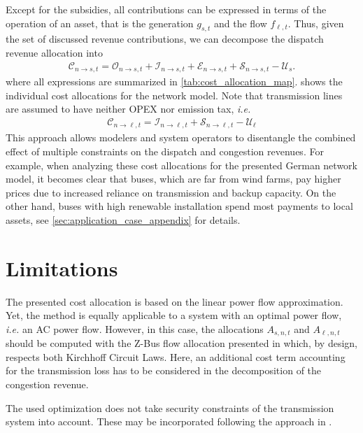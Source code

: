 \documentclass[11pt,twocolumn]{article}
\newcommand{\ie}{\textit{i.e.} }
\newcommand{\ra}{\rightarrow}
\newcommand{\generation}{g_{s,t}}
\newcommand{\flow}{f_{\ell,t}}
\newcommand{\cost}{\mathcal{C}}
\newcommand{\opex}{\mathcal{O}}
\newcommand{\capex}{\mathcal{I}}
\newcommand{\emissioncost}{\mathcal{E}}
\newcommand{\scarcitycost}{\mathcal{S}}
\newcommand{\subsidycost}{\mathcal{U}}
\newcommand{\allocategeneration}[1][s, n]{A_{#1,t}}
\newcommand{\allocateflow}[1][n]{A_{\ell,#1,t}}
\newcommand{\allocategeneratorcost}[1][n \rightarrow s]{\cost_{#1, t}}
\newcommand{\allocatelinecost}[1][n \rightarrow \ell]{\cost_{#1, t}}
\newcommand{\allocatecapex}[1][n \rightarrow s,t]{\mathcal{I}_{#1}}
\newcommand{\allocateopex}[1][n \rightarrow s]{\opex_{#1,t}}
\newcommand{\allocateemissioncost}[1][n \rightarrow s]{\emissioncost_{#1,t}}
\newcommand{\allocatescarcitycost}[1][n \rightarrow s]{\scarcitycost_{#1,t}}
\begin{document}
Except for the subsidies, all contributions can be expressed in terms of the operation of an asset, that is the generation $\generation$ and the flow $\flow$. Thus, given the set of discussed revenue contributions, we can decompose the dispatch revenue allocation into 
\begin{align}
    \allocategeneratorcost = \allocateopex + \allocatecapex + \allocateemissioncost + \allocatescarcitycost - \subsidycost_s .
\end{align} 
where all expressions are summarized in \cref{tab:cost_allocation_map}.  shows the individual cost allocations for the network model. Note that transmission lines are assumed to have neither \ac{OPEX} nor emission tax, \ie
\begin{align}
    \allocatelinecost = \capex_{n \ra \ell, t} + \scarcitycost_{n \ra \ell, t} - \subsidycost_\ell
\end{align}
This approach allows modelers and system operators to disentangle the combined effect of multiple constraints on the dispatch and congestion revenues. For example, when analyzing these cost allocations for the presented German network model, it becomes clear that buses, which are far from wind farms, pay higher prices due to increased reliance on transmission and backup capacity. On the other hand, buses with high renewable installation spend most payments to local assets, see \cref{sec:application_case_appendix} for details. 



\section{Limitations}
\label{sec:limitations}

The presented cost allocation is based on the linear power flow approximation. Yet, the method is equally applicable to a system with an optimal power flow, \ie an \ac{AC} power flow. However, in this case, the allocations $\allocategeneration$ and $\allocateflow$ should be computed with the Z-Bus flow allocation presented in \cite{conejo_z-bus_2007} which, by design, respects both Kirchhoff Circuit Laws. Here, an additional cost term accounting for the transmission loss has to be considered in the decomposition of the congestion revenue. 

The used optimization does not take security constraints of the transmission system into account. These may be incorporated following the approach in \cite{nikoukar_transmission_2012}. 
\end{document}
